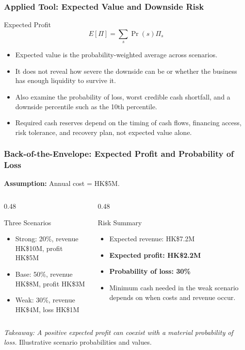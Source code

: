 \documentclass{beamer}
\begin{document}
\begin{frame}[t]
\frametitle{Applied Tool: Expected Value and Downside Risk}
\begin{block}{Expected Profit}
\[
E[\Pi]=\sum_s \Pr(s)\Pi_s
\]
\end{block}
\begin{itemize}
\item Expected value is the probability-weighted average across scenarios.
\item It does not reveal how severe the downside can be or whether the business has enough liquidity to survive it.
\item Also examine the probability of loss, worst credible cash shortfall, and a downside percentile such as the 10th percentile.
\item Required cash reserves depend on the timing of cash flows, financing access, risk tolerance, and recovery plan, not expected value alone.
\end{itemize}
\end{frame}

\begin{frame}[t,shrink=11]
\frametitle{Back-of-the-Envelope: Expected Profit and Probability of Loss}
\textbf{Assumption:} Annual cost = HK\$5M.
\begin{columns}[T]
\begin{column}{0.48\textwidth}\begin{block}{Three Scenarios}
\begin{itemize}
\item Strong: 20\%, revenue HK\$10M, profit HK\$5M
\item Base: 50\%, revenue HK\$8M, profit HK\$3M
\item Weak: 30\%, revenue HK\$4M, loss HK\$1M
\end{itemize}\end{block}\end{column}
\begin{column}{0.48\textwidth}\begin{block}{Risk Summary}
\begin{itemize}
\item Expected revenue: HK\$7.2M
\item \textbf{Expected profit: HK\$2.2M}
\item \textbf{Probability of loss: 30\%}
\item Minimum cash needed in the weak scenario depends on when costs and revenue occur.
\end{itemize}\end{block}\end{column}
\end{columns}
\textit{Takeaway: A positive expected profit can coexist with a material probability of loss.}
\vfill{\tiny Illustrative scenario probabilities and values.}
\end{frame}
\end{document}
